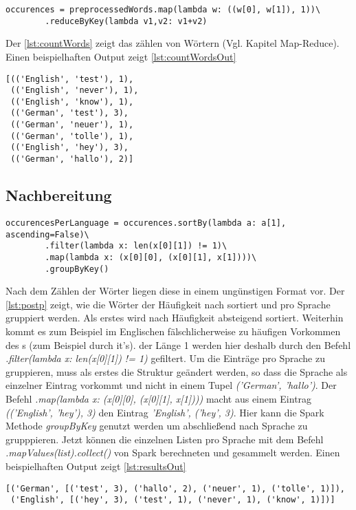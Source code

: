 \documentclass[chapterprefix=true, 12pt, a4paper, oneside, parskip=half, listof=totoc, bibliography=totoc, numbers=noendperiod]{scrbook}
\begin{document}
 \begin{lstlisting}[caption={Wörter zählen}, captionpos=b, label={lst:countWords}]
occurences = preprocessedWords.map(lambda w: ((w[0], w[1]), 1))\
        .reduceByKey(lambda v1,v2: v1+v2)
\end{lstlisting}

Der \autoref{lst:countWords} zeigt das zählen von Wörtern (Vgl. Kapitel Map-Reduce). Einen beispielhaften Output zeigt \autoref{lst:countWordsOut}


 \begin{lstlisting}[caption={Wörter zählen Output}, captionpos=b, label={lst:countWordsOut}]
[(('English', 'test'), 1),
 (('English', 'never'), 1),
 (('English', 'know'), 1),
 (('German', 'test'), 3),
 (('German', 'neuer'), 1),
 (('German', 'tolle'), 1),
 (('English', 'hey'), 3),
 (('German', 'hallo'), 2)]
\end{lstlisting}

\subsection{Nachbereitung}
 \begin{lstlisting}[caption={Nachbearbeitung}, captionpos=b, label={lst:postp}]
occurencesPerLanguage = occurences.sortBy(lambda a: a[1], ascending=False)\
        .filter(lambda x: len(x[0][1]) != 1)\
        .map(lambda x: (x[0][0], (x[0][1], x[1])))\
        .groupByKey()
\end{lstlisting}


Nach dem Zählen der Wörter liegen diese in einem ungünstigen Format vor. Der \autoref{lst:postp} zeigt, wie die Wörter der Häufigkeit nach sortiert und pro Sprache gruppiert werden. Als erstes wird nach Häufigkeit absteigend sortiert. Weiterhin kommt es zum Beispiel im Englischen fälschlicherweise zu häufigen Vorkommen des  s (zum Beispiel durch it's).  der Länge 1 werden hier deshalb durch den Befehl  \textit{.filter(lambda x: len(x[0][1]) != 1)} gefiltert.  Um die Einträge pro Sprache zu gruppieren, muss als erstes die Struktur geändert werden, so dass die Sprache als einzelner Eintrag vorkommt und nicht in einem Tupel \textit{('German', 'hallo')}. Der Befehl \textit{.map(lambda x: (x[0][0], (x[0][1], x[1])))} macht aus einem Eintrag \textit{(('English', 'hey'), 3)} den Eintrag \textit{'English', ('hey', 3)}. Hier kann die Spark Methode \textit{groupByKey} genutzt werden um abschließend nach Sprache zu grupppieren. Jetzt können die einzelnen Listen pro Sprache mit dem Befehl \textit{.mapValues(list).collect()} von Spark berechneten und gesammelt werden. Einen beispielhaften Output zeigt \autoref{lst:resultsOut}
 \begin{lstlisting}[caption={Nachbearbeitung Output}, captionpos=b, label={lst:resultsOut}]
[('German', [('test', 3), ('hallo', 2), ('neuer', 1), ('tolle', 1)]),
 ('English', [('hey', 3), ('test', 1), ('never', 1), ('know', 1)])]
\end{lstlisting}
\end{document}
